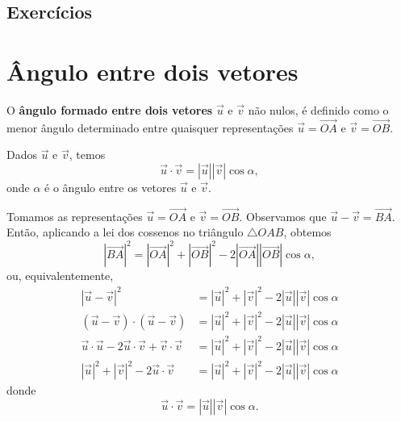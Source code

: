 \subsection*{Exercícios}

\emconstrucao

\section{Ângulo entre dois vetores}\label{cap_prodesc_sec_angulo}

O {\bf ângulo formado entre dois vetores} $\vec{u}$ e $\vec{v}$ não nulos, é definido como o menor ângulo determinado entre quaisquer representações $\vec{u} = \overrightarrow{OA}$ e $\vec{v} = \overrightarrow{OB}$.

\begin{prop}\label{prop:angulo_prodesc}
  Dados $\vec{u}$ e $\vec{v}$, temos
  \begin{equation}
    \vec{u}\cdot\vec{v}=|\vec{u}||\vec{v}|\cos\alpha,
  \end{equation}
  onde $\alpha$ é o ângulo entre os vetores $\vec{u}$ e $\vec{v}$.
\end{prop}
\begin{dem}
  Tomamos as representações $\vec{u} = \overrightarrow{OA}$ e $\vec{v} = \overrightarrow{OB}$. Observamos que $\vec{u}-\vec{v} = \overrightarrow{BA}$. Então, aplicando a lei dos cossenos no triângulo $\triangle OAB$, obtemos
  \begin{equation}
    |\overrightarrow{BA}|^2 = |\overrightarrow{OA}|^2 + |\overrightarrow{OB}|^2 - 2|\overrightarrow{OA}||\overrightarrow{OB}|\cos\alpha,
  \end{equation}
  ou, equivalentemente,
  \begin{align}
    |\vec{u}-\vec{v}|^2 &= |\vec{u}|^2+|\vec{v}|^2-2|\vec{u}||\vec{v}|\cos\alpha\\
    (\vec{u}-\vec{v})\cdot(\vec{u}-\vec{v}) &= |\vec{u}|^2+|\vec{v}|^2-2|\vec{u}||\vec{v}|\cos\alpha\\
    \vec{u}\cdot\vec{u}-2\vec{u}\cdot\vec{v}+\vec{v}\cdot\vec{v} &= |\vec{u}|^2+|\vec{v}|^2-2|\vec{u}||\vec{v}|\cos\alpha\\
    |\vec{u}|^2+|\vec{v}|^2-2\vec{u}\cdot\vec{v} &= |\vec{u}|^2+|\vec{v}|^2-2|\vec{u}||\vec{v}|\cos\alpha
  \end{align}
  donde
  \begin{equation}
    \vec{u}\cdot\vec{v} = |\vec{u}||\vec{v}|\cos\alpha.
  \end{equation}
\end{dem}

